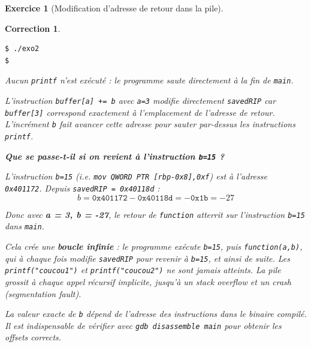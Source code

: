 \documentclass[a4paper,11pt]{article}
\theoremstyle{plain}
\newtheorem{correction}{Correction}
\theoremstyle{definition}
\newtheorem{exercice}{Exercice}
\begin{document}
\begin{exercice}[Modification d'adresse de retour dans la pile]
\begin{correction}
\begin{lstlisting}[language=bash,numbers=none]
$ ./exo2
$
\end{lstlisting}

Aucun \texttt{printf} n'est exécuté : le programme saute directement à la fin de \texttt{main}.

\begin{pointcle}
L'instruction \texttt{buffer[a] += b} avec \texttt{a=3} modifie directement \texttt{savedRIP} car \texttt{buffer[3]} correspond exactement à l'emplacement de l'adresse de retour. L'incrément \texttt{b} fait avancer cette adresse pour sauter par-dessus les instructions \texttt{printf}.
\end{pointcle}

\bigskip

\textbf{Que se passe-t-il si on revient à l'instruction \texttt{b=15} ?}

L'instruction \texttt{b=15} (i.e. \texttt{mov QWORD PTR [rbp-0x8],0xf}) est à l'adresse \texttt{0x401172}. Depuis \texttt{savedRIP = 0x40118d} :
\[
b = \texttt{0x401172} - \texttt{0x40118d} = -\texttt{0x1b} = -27
\]

Donc avec \textbf{a = 3, b = -27}, le retour de \texttt{function} atterrit sur l'instruction \texttt{b=15} dans \texttt{main}.

Cela crée une \textbf{boucle infinie} : le programme exécute \texttt{b=15}, puis \texttt{function(a,b)}, qui à chaque fois modifie \texttt{savedRIP} pour revenir à \texttt{b=15}, et ainsi de suite. Les \texttt{printf("coucou1")} et \texttt{printf("coucou2")} ne sont jamais atteints. La pile grossit à chaque appel récursif implicite, jusqu'à un \textit{stack overflow} et un crash (\textit{segmentation fault}).

\begin{attention}
La valeur exacte de \texttt{b} dépend de l'adresse des instructions dans le binaire compilé. Il est indispensable de vérifier avec \texttt{gdb disassemble main} pour obtenir les offsets corrects.
\end{attention}
\end{correction}

\end{exercice}


\end{document}
